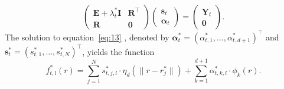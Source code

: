 \documentclass[12pt]{article}
\newcommand{\T}{\intercal}
\theoremstyle{definition}
\begin{document}
\begin{equation}
  \left(
    \begin{array}{cc}
      \mathbf{E} + \lambda_t^* \mathbf{I} & \mathbf{R}^\T \\
      \mathbf{R} & \mathbf{0}
    \end{array}
  \right)\left(
    \begin{array}{c}
      \mathbf{s}_t \\
      \mathbf{\alpha}_t
    \end{array}
  \right) = \left(
    \begin{array}{c}
      \mathbf{Y}_t \\
      \mathbf{0}
    \end{array}
  \right). \label{eq:13}
\end{equation}
The solution to equation~\eqref{eq:13} , denoted by $\mathbf{\alpha}^*_t=(\alpha^*_{t,1},\ldots,\alpha^*_{t,d+1})^\T$ and $\mathbf{s}^*_t=(s^*_{t,1},\ldots,s^*_{t,N})^\T$, yields the function
\begin{equation}\nonumber
  f_{t, l}^*(r) = \sum_{j=1}^{N}s_{t, j, l}^* \cdot  \eta_{d}\left(\|r - r_j^*\|\right) + \sum_{k=1}^{d + 1}\alpha_{t, k, l}^* \cdot \phi_k(r).
\end{equation}
\end{document}
